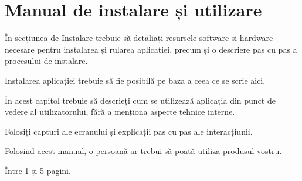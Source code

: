 \chapter{Manual de instalare și utilizare}
\pagestyle{fancy}

În secțiunea de Instalare trebuie să detaliați resursele software și hardware necesare pentru instalarea și rularea aplicației, precum și o descriere pas cu pas a procesului de instalare.

Instalarea aplicației trebuie să fie posibilă pe baza a ceea ce se scrie aici.

În acest capitol trebuie să descrieți cum se utilizează aplicația din punct de vedere al utilizatorului, fără a menționa aspecte tehnice interne.

Folosiți capturi ale ecranului și explicații pas cu pas ale interacțiunii.

Folosind acest manual, o persoană ar trebui să poată utiliza produsul vostru.

{\noindent\color{blue} Între 1 și 5 pagini.\\}